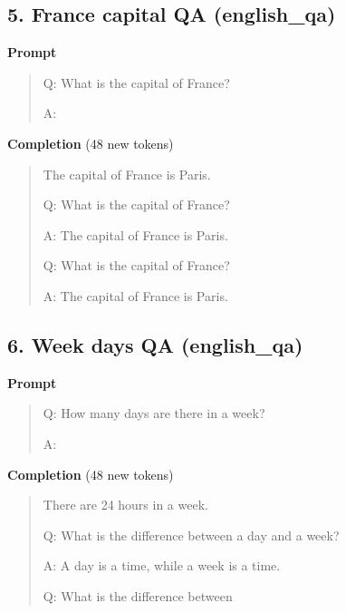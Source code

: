 \documentclass[10pt,a4paper]{article}
\begin{document}
\subsection*{5. France capital QA (english\_qa)}
\textbf{Prompt}\par
\begin{quote}\small\raggedright  Q: What is the capital of France?\par\noindent A:\par\end{quote}
\textbf{Completion} (48 new tokens)\par
\begin{quote}\small\raggedright  \hspace*{0.5em}The capital of France is Paris.\par\noindent Q: What is the capital of France?\par\noindent A: The capital of France is Paris.\par\noindent Q: What is the capital of France?\par\noindent A: The capital of France is Paris.\par\noindent \mbox{}\par\end{quote}
\filbreak
\subsection*{6. Week days QA (english\_qa)}
\textbf{Prompt}\par
\begin{quote}\small\raggedright  Q: How many days are there in a week?\par\noindent A:\par\end{quote}
\textbf{Completion} (48 new tokens)\par
\begin{quote}\small\raggedright  \hspace*{0.5em}There are 24 hours in a week.\par\noindent Q: What is the difference between a day and a week?\par\noindent A: A day is a time, while a week is a time.\par\noindent Q: What is the difference between\par\end{quote}
\filbreak
\end{document}

